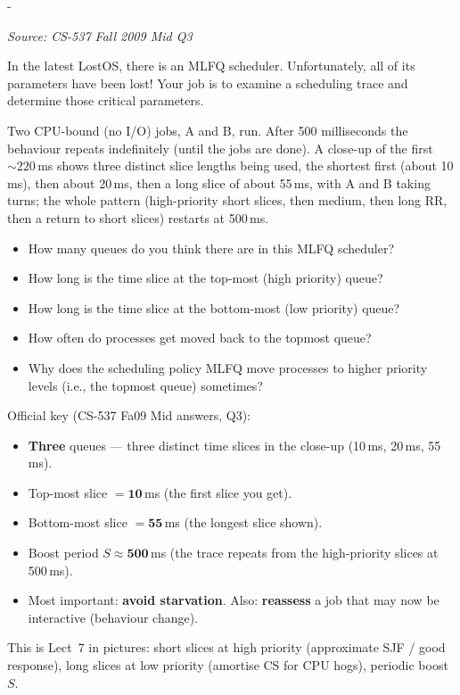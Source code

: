 \documentclass[11pt,a4paper]{article}
\makeatletter
\newcommand{\keepspace}[1]{\par\penalty-100\begingroup
  \setlength{\dimen@}{#1}\dimen@ii\pagegoal\advance\dimen@ii-\pagetotal
  \ifdim\dimen@>\dimen@ii\ifdim\dimen@ii>\z@\vfil\fi\break\fi\endgroup}
\newcounter{qn}[section]
\newenvironment{Qn}[4]{%
  \refstepcounter{qn}\keepspace{7\baselineskip}%
  \begin{tcolorbox}[qboxstyle, title={Q\thesection.\theqn\ \ [#1 \textbar\ #2]\ \ #4}]%
  {\footnotesize\color{g3}\textit{Source: #3}}\par\smallskip%
}{%
  \end{tcolorbox}%
}
\newenvironment{Sol}{%
  \begin{tcolorbox}[sboxstyle, title={Solution}]%
}{%
  \end{tcolorbox}\vspace{0.35em}%
}
\makeatother
\begin{document}
\begin{Qn}{Hard}{Lect 7}{CS-537 Fall 2009 Mid Q3}{Reverse-engineer lost MLFQ parameters from a trace}
In the latest LostOS, there is an MLFQ scheduler. Unfortunately, all of its parameters have been lost! Your job is to examine a scheduling trace and determine those critical parameters.

Two CPU-bound (no I/O) jobs, A and B, run. After 500 milliseconds the behaviour repeats indefinitely (until the jobs are done). A close-up of the first $\sim 220$\,ms shows three distinct slice lengths being used, the shortest first (about 10\,ms), then about 20\,ms, then a long slice of about 55\,ms, with A and B taking turns; the whole pattern (high-priority short slices, then medium, then long RR, then a return to short slices) restarts at 500\,ms.
\begin{itemize}
  \item[(a)] How many queues do you think there are in this MLFQ scheduler?
  \item[(b)] How long is the time slice at the top-most (high priority) queue?
  \item[(c)] How long is the time slice at the bottom-most (low priority) queue?
  \item[(d)] How often do processes get moved back to the topmost queue?
  \item[(e)] Why does the scheduling policy MLFQ move processes to higher priority levels (i.e., the topmost queue) sometimes?
\end{itemize}
\end{Qn}
\begin{Sol}
Official key (CS-537 Fa09 Mid answers, Q3):
\begin{itemize}
  \item[(a)] \textbf{Three} queues --- three distinct time slices in the close-up (10\,ms, 20\,ms, 55\,ms).
  \item[(b)] Top-most slice $= \mathbf{10}$\,ms (the first slice you get).
  \item[(c)] Bottom-most slice $= \mathbf{55}$\,ms (the longest slice shown).
  \item[(d)] Boost period $S \approx \mathbf{500}$\,ms (the trace repeats from the high-priority slices at 500\,ms).
  \item[(e)] Most important: \textbf{avoid starvation}. Also: \textbf{reassess} a job that may now be interactive (behaviour change).
\end{itemize}
This is Lect~7 in pictures: short slices at high priority (approximate SJF / good response), long slices at low priority (amortise CS for CPU hogs), periodic boost $S$.
\end{Sol}
\end{document}
